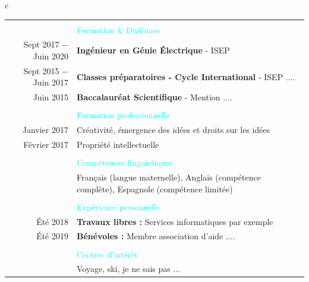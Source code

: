 \documentclass[10pt,a4paper]{report}
\begin{document}
\begin{table}[H]
\begin{tabular}{c}
\begin{tabular}{rl}
\begin{minipage}[htbp]{3.35cm}
\textcolor {cyan} {\rule[-3.25mm]{\linewidth}{2mm}} \\
\end{minipage} 
& \textcolor {cyan} {\Large{Formation \& Diplômes}} \\
Sept 2017 $-$ Juin 2020 & \textbf{\large{Ingénieur en Génie Électrique}} - ISEP \\
Sept 2015 $-$ Juin 2017 & \textbf{\large{Classes préparatoires - Cycle International}} - ISEP .... \\
Juin 2015 & \textbf{\large{Baccalauréat Scientifique}} - Mention .... \\
\begin{minipage}[htbp]{3.35cm}
\textcolor {cyan} {\rule[-3.25mm]{\linewidth}{2mm}} \\
\end{minipage} 
& \textcolor {cyan} {\Large{Formation professionnelle}} \\
Janvier 2017 & Créativité, émergence des idées et droits sur les idées \\
Février 2017 & Propriété intellectuelle \\
 \begin{minipage}[htbp]{3.35cm}
\textcolor {cyan} {\rule[-3.25mm]{\linewidth}{2mm}} \\
\end{minipage} 
& \textcolor {cyan} {\Large{Compétences linguistiques}} \\
 & Français (langue maternelle), Anglais (compétence complète), Espagnole (compétence limitée) \\
\begin{minipage}[htbp]{3.35cm}
\textcolor {cyan} {\rule[-3.25mm]{\linewidth}{2mm}} \\
\end{minipage} 
& \textcolor {cyan} {\Large{Expérience personnelle}} \\
Été 2018 & \textbf{{Travaux libres :}} Services informatiques par exemple \\
Été 2019 & \textbf{{Bénévoles :}} Membre association d'aide .... \\
\begin{minipage}[htbp]{3.35cm}
\textcolor {cyan} {\rule[-3.25mm]{\linewidth}{2mm}} \\
\end{minipage} 
& \textcolor {cyan} {\Large{Centres d'intérêt}} \\
 & Voyage, ski, je ne sais pas ... \\
\end{tabular}
\\
\end{tabular}
\end{table}

\vspace{-0.5cm}
\end{document}
